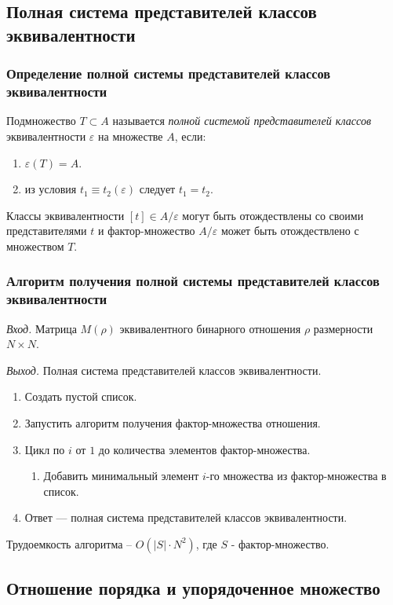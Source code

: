 \documentclass[bachelor, och, labwork]{shiza}
\begin{document}
\subsection{Полная система представителей классов эквивалентности}
\subsubsection{Определение полной системы представителей классов эквивалентности}
Подмножество $T\subset A$ называется \textit{полной системой представителей классов}
эквивалентности $\varepsilon$ на множестве $A$, если:
\begin{center}
    \begin{enumerate}
        \item $\varepsilon(T)=A$.
        \item из условия $t_1\equiv t_2(\varepsilon)$ следует $t_1=t_2$.
    \end{enumerate}
\end{center}
Классы эквивалентности $[t]\in A/\varepsilon$ могут быть отождествлены со своими
представителями $t$ и фактор-множество $A/\varepsilon$ может быть
отождествлено с множеством $T$.

\subsubsection{Алгоритм получения полной системы представителей классов эквивалентности}
\textit{Вход.} Матрица $M(\rho)$ эквивалентного бинарного отношения $\rho$ размерности
$N \times N$.

\textit{Выход.} Полная система представителей классов эквивалентности.
\begin{enumerate}
    \item Создать пустой список.
    \item Запустить алгоритм получения фактор-множества отношения.
    \item Цикл по $i$ от $1$ до количества элементов фактор-множества.
        \begin{enumerate} \item Добавить минимальный элемент $i$-го множества из фактор-множества в список.\end{enumerate}
    \item Ответ --- полная система представителей классов эквивалентности.
\end{enumerate}
Трудоемкость алгоритма -- $O(|S|\cdot N^2)$, где $S$ - фактор-множество.

\subsection{Отношение порядка и упорядоченное множество}
\end{document}
